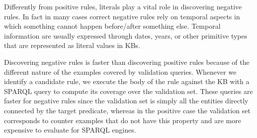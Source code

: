 Differently from positive rules, literals play a vital role in discovering negative rules. In fact in many cases correct negative rules rely on temporal aspects in which something cannot happen before/after something else. Temporal information are usually expressed through dates, years, or other primitive types that are represented as literal values in KBs.

Discovering negative rules is faster than discovering positive rules
because of the different nature of the examples covered by validation queries. 
Whenever we identify a candidate rule, we execute the body of the rule against the KB with a SPARQL query to compute its coverage over the validation set. 
These queries are faster for negative rules since the validation set is simply all the entities directly connected by the target predicate, whereas in the positive case the validation set corresponds to counter examples that do not have this property and are more expensive to evaluate for SPARQL engines.

